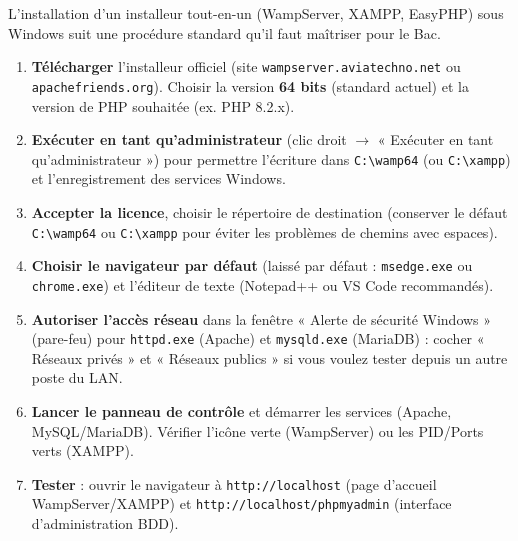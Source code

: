 \documentclass[11pt]{article}
\begin{document}
L'installation d'un installeur tout-en-un (WampServer, XAMPP, EasyPHP) sous Windows suit une procédure standard qu'il faut maîtriser pour le Bac.

\begin{methode}
\begin{enumerate}
\item \textbf{Télécharger} l'installeur officiel (site \texttt{wampserver.aviatechno.net} ou \texttt{apachefriends.org}). Choisir la version \textbf{64 bits} (standard actuel) et la version de PHP souhaitée (ex. PHP 8.2.x).
\item \textbf{Exécuter en tant qu'administrateur} (clic droit $\rightarrow$ « Exécuter en tant qu'administrateur ») pour permettre l'écriture dans \texttt{C:\textbackslash wamp64} (ou \texttt{C:\textbackslash xampp}) et l'enregistrement des services Windows.
\item \textbf{Accepter la licence}, choisir le répertoire de destination (conserver le défaut \texttt{C:\textbackslash wamp64} ou \texttt{C:\textbackslash xampp} pour éviter les problèmes de chemins avec espaces).
\item \textbf{Choisir le navigateur par défaut} (laissé par défaut : \texttt{msedge.exe} ou \texttt{chrome.exe}) et l'éditeur de texte (Notepad++ ou VS Code recommandés).
\item \textbf{Autoriser l'accès réseau} dans la fenêtre « Alerte de sécurité Windows » (pare-feu) pour \texttt{httpd.exe} (Apache) et \texttt{mysqld.exe} (MariaDB) : cocher « Réseaux privés » et « Réseaux publics » si vous voulez tester depuis un autre poste du LAN.
\item \textbf{Lancer le panneau de contrôle} et démarrer les services (Apache, MySQL/MariaDB). Vérifier l'icône verte (WampServer) ou les PID/Ports verts (XAMPP).
\item \textbf{Tester} : ouvrir le navigateur à \texttt{http://localhost} (page d'accueil WampServer/XAMPP) et \texttt{http://localhost/phpmyadmin} (interface d'administration BDD).
\end{enumerate}
\end{methode}
\end{document}
